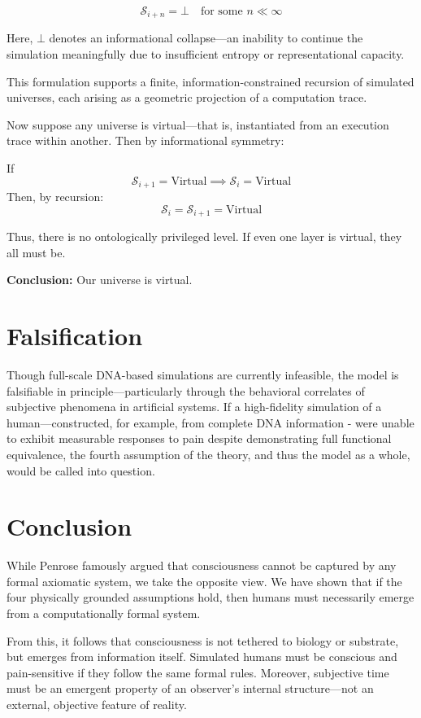 \documentclass[11pt]{article}
\begin{document}
\[
  \mathcal{S}_{i+n} = \bot \quad \text{for some } n \ll \infty
\]

Here, \( \bot \) denotes an informational collapse—an inability to continue the simulation meaningfully due to insufficient 
entropy or representational capacity.

This formulation supports a finite, information-constrained recursion of simulated universes, each arising as a geometric 
projection of a computation trace.

Now suppose any universe is virtual—that is, instantiated from an execution trace within another. Then by informational symmetry:

If
\[
  \mathcal{S}_{i+1} = \text{Virtual} \implies \mathcal{S}_i = \text{Virtual}
\]
Then, by recursion:
\[
  \mathcal{S}_i = \mathcal{S}_{i+1} = \text{Virtual}
\]

Thus, there is no ontologically privileged level. If even one layer is virtual, they all must be.

\textbf{Conclusion:} Our universe is virtual.



\section{Falsification}

Though full-scale DNA-based simulations are currently infeasible, the model is falsifiable in principle—particularly 
through the behavioral correlates of subjective phenomena in artificial systems. If a high-fidelity simulation of a 
human—constructed, for example, from complete DNA information - were unable to exhibit measurable responses to pain 
despite demonstrating full functional equivalence, the fourth assumption of the theory, and thus the model as a whole, 
would be called into question.



\section{Conclusion}

While Penrose \cite{penrose1989emperor} famously argued that consciousness cannot be captured by any formal 
axiomatic system, we take the opposite view. We have shown that if the four physically grounded assumptions hold,
then humans must necessarily emerge from a computationally formal system.

From this, it follows that consciousness is not tethered to biology or substrate, but emerges from information itself. 
Simulated humans must be conscious and pain-sensitive if they follow the same formal rules. Moreover, subjective 
time must be an emergent property of an observer’s internal structure—not an external, objective feature of reality.
\end{document}
